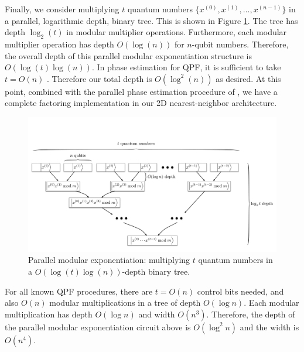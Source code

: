 Finally, we consider multiplying $t$ quantum numbers
$\{x^{(0)}, x^{(1)}, \ldots, x^{(n-1)}\}$ in a parallel,
logarithmic depth, binary tree.
This is shown in Figure \ref{fig:modexp-qq-parallel}.
The tree has depth $\log_2(t)$ in modular multiplier operations. Furthermore,
each
modular multiplier operation has depth $O(\log(n))$ for $n$-qubit
numbers. Therefore, the overall depth of this parallel modular exponentiation
structure is $O(\log(t)\log(n))$. In phase estimation for QPF, it is
sufficient to take $t = O(n)$ \cite{Nielsen2000,Kitaev2002}. Therefore our total depth is
$O(\log^2(n))$ as desired. At this point, combined with the parallel phase
estimation procedure of \cite{Kitaev2002}, we have a complete factoring
implementation in our 2D nearest-neighbor architecture.
%
\begin{figure}[tb!]
\centerline{
\includegraphics[width=5.5in]{figures/mod-exp-par.pdf}
}
\caption{Parallel modular exponentiation: multiplying $t$ quantum numbers
in a $O(\log{(t)}\log{(n)})$-depth binary tree.}
\label{fig:modexp-qq-parallel}
\end{figure} 

For all known QPF procedures, there are $t=O(n)$ control bits needed, and
also $O(n)$ modular multiplications in a tree of depth $O(\log n)$.
Each modular multiplication has
depth $O(\log n)$ and width $O(n^3)$.
Therefore, the depth of the parallel modular exponentiation circuit above
is $O(\log^2 n)$ and the width is $O(n^4)$.

